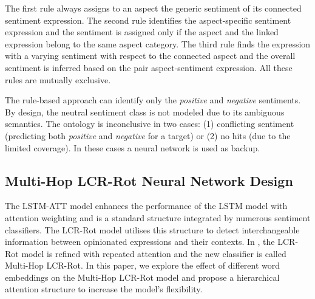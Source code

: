 \documentclass[hidelinks]{llncs}
\begin{document}
The first rule always assigns to an aspect the generic sentiment of its connected sentiment expression. The second rule identifies the aspect-specific sentiment expression and the sentiment is assigned only if the aspect and the linked expression belong to the same aspect category. The third rule finds the expression with a varying sentiment with respect to the connected aspect and the overall sentiment is inferred based on the pair aspect-sentiment expression. All these rules are mutually exclusive. 



The rule-based approach can identify only the \textit{positive} and \textit{negative} sentiments. By design, the neutral sentiment class is not modeled due to its ambiguous semantics. The ontology is inconclusive in two cases: (1) conflicting sentiment (predicting both \textit{positive} and \textit{negative} for a target) or (2) no hits (due to the limited coverage). In these cases a neural network is used as backup.

\subsection{Multi-Hop LCR-Rot Neural Network Design}\label{Multi_Hop}

The LSTM-ATT \cite{he2018exploiting, wang2016attention} model enhances the performance of the LSTM model with attention weighting and is a standard structure integrated by numerous sentiment classifiers. The LCR-Rot model \cite{zheng2018left} utilises this structure to detect interchangeable information between opinionated expressions and their contexts. In \cite{wallaart2019hybrid}, the LCR-Rot model is refined with repeated attention and the new classifier is called Multi-Hop LCR-Rot. In this paper, we explore the effect of different word embeddings on the Multi-Hop LCR-Rot model and propose a hierarchical attention structure to increase the model's flexibility.
\end{document}
